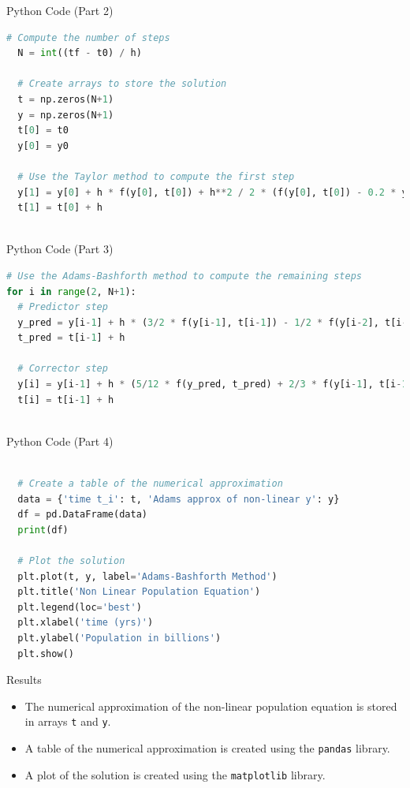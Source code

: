 \documentclass{beamer}
\begin{document}
\begin{frame}[fragile]{Python Code (Part 2)}
  \begin{lstlisting}[language=Python,basicstyle=\ttfamily,breaklines=true,keywordstyle=\color{blue}]
  # Compute the number of steps
  N = int((tf - t0) / h)
  
  # Create arrays to store the solution
  t = np.zeros(N+1)
  y = np.zeros(N+1)
  t[0] = t0
  y[0] = y0
  
  # Use the Taylor method to compute the first step
  y[1] = y[0] + h * f(y[0], t[0]) + h**2 / 2 * (f(y[0], t[0]) - 0.2 * y[0])
  t[1] = t[0] + h
  
  \end{lstlisting}
\end{frame}

\begin{frame}[fragile]{Python Code (Part 3)}
  \begin{lstlisting}[language=Python,basicstyle=\ttfamily,breaklines=true,keywordstyle=\color{blue}]
  # Use the Adams-Bashforth method to compute the remaining steps
for i in range(2, N+1):
  # Predictor step
  y_pred = y[i-1] + h * (3/2 * f(y[i-1], t[i-1]) - 1/2 * f(y[i-2], t[i-2]))
  t_pred = t[i-1] + h
  
  # Corrector step
  y[i] = y[i-1] + h * (5/12 * f(y_pred, t_pred) + 2/3 * f(y[i-1], t[i-1]) - 1/12 * f(y[i-2], t[i-2]))
  t[i] = t[i-1] + h
  
  \end{lstlisting}
\end{frame}

\begin{frame}[fragile]{Python Code (Part 4)}
  \begin{lstlisting}[language=Python,basicstyle=\ttfamily,breaklines=true,keywordstyle=\color{blue}]
  
  # Create a table of the numerical approximation
  data = {'time t_i': t, 'Adams approx of non-linear y': y}
  df = pd.DataFrame(data)
  print(df)
  
  # Plot the solution
  plt.plot(t, y, label='Adams-Bashforth Method')
  plt.title('Non Linear Population Equation')
  plt.legend(loc='best')
  plt.xlabel('time (yrs)')
  plt.ylabel('Population in billions')
  plt.show()
  \end{lstlisting}
\end{frame}


\begin{frame}{Results}
  \begin{itemize}
    \item The numerical approximation of the non-linear population equation is stored in arrays \texttt{t} and \texttt{y}.
    \item A table of the numerical approximation is created using the \texttt{pandas} library.
    \item A plot of the solution is created using the \texttt{matplotlib} library.
  \end{itemize}
\end{frame}
\end{document}
